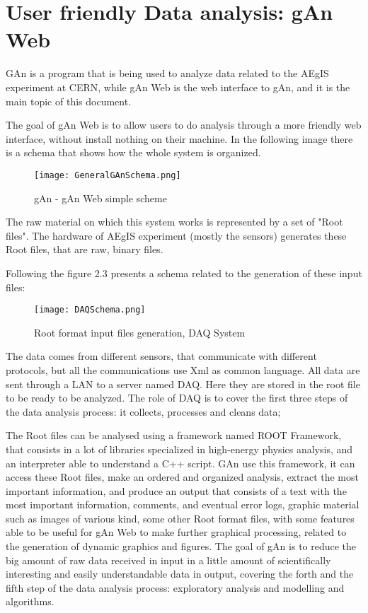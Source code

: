 \section{User friendly Data analysis: gAn Web}

GAn is a program that is being used to analyze data related to the AEgIS experiment at CERN, while gAn Web is the web interface to gAn, and it is the main topic of this document.

The goal of gAn Web is to allow users to do analysis through a more friendly web interface, without install nothing on their machine. In the following image there is a schema that shows how the whole system is organized.

\begin{figure}[H]
\centering
\texttt{[image: GeneralGAnSchema.png]} 
\caption{gAn - gAn Web simple scheme}
\end{figure}


The raw material on which this system works is represented by a set of "Root files". 
The hardware of AEgIS experiment (mostly the sensors) generates these Root files, that are raw, binary files. 
 
Following the figure 2.3 presents a schema related to the generation of these input files:

\begin{figure}[H]
\centering
\texttt{[image: DAQSchema.png]} 
\caption{Root format input files generation, DAQ System}
\end{figure}

The data comes from different sensors, that communicate with different protocols, but all the communications use Xml as common language. All data are sent through a LAN to a server named DAQ. Here they are stored in the root file to be ready to be analyzed.
The role of DAQ is to cover the first three steps of the data analysis process: it collects, processes and cleans data;

The Root files can be analysed using a framework named ROOT Framework, that consists in a lot of libraries specialized in high-energy physics analysis, and an interpreter able to understand a C++ script.
GAn use this framework, it can access these Root files, make an ordered and organized analysis, extract the most important information, and produce an output that consists of a text with the most important information, comments, and eventual error logs, graphic material such as images of various kind, some other Root format files, with some features able to be useful for gAn Web to make further graphical processing, related to the generation of dynamic graphics and figures. 
The goal of gAn is to reduce the big amount of raw data received in input in a little amount of scientifically interesting and easily understandable data in output, covering the forth and the fifth step of the data analysis process: exploratory analysis and modelling and algorithms.

